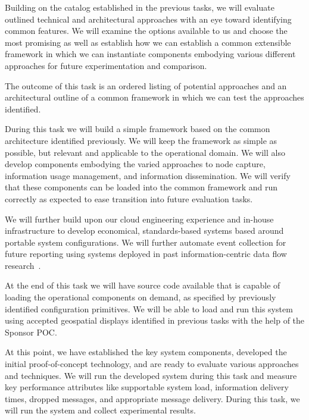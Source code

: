 \documentclass{sbir}
\begin{document}
Building on the catalog established in the previous tasks, we will evaluate outlined technical and architectural approaches with an eye toward identifying common features. We will examine the options available to us and choose the most promising as well as establish how we can establish a common extensible framework in which we can instantiate components embodying various different approaches for future experimentation and comparison.

The outcome of this task is an ordered listing of potential approaches and an architectural outline of a common framework in which we can test the approaches identified.

During this task we will build a simple framework based on the common architecture identified previously. We will keep the framework as simple as possible, but relevant and applicable to the operational domain. We will also develop components embodying the varied approaches to node capture, information usage management, and information dissemination. We will verify that these components can be loaded into the common framework and run correctly as expected to ease transition into future evaluation tasks.

We will further build upon our cloud engineering experience and in-house infrastructure to develop economical, standards-based systems based around portable system configurations. We will further automate event collection for future reporting using systems deployed in past information-centric data flow research~\cite{LaHe:12b}.

At the end of this task we will have source code available that is capable of loading the operational components on demand, as specified by previously identified configuration primitives. We will be able to load and run this system using accepted geospatial displays identified in previous tasks with the help of the Sponsor POC.

At this point, we have established the key system components, developed the initial proof-of-concept technology, and are ready to evaluate various approaches and techniques. We will run the developed system during this task and measure key performance attributes like supportable system load, information delivery times, dropped messages, and appropriate message delivery. During this task, we will run the system and collect experimental results.
\end{document}
